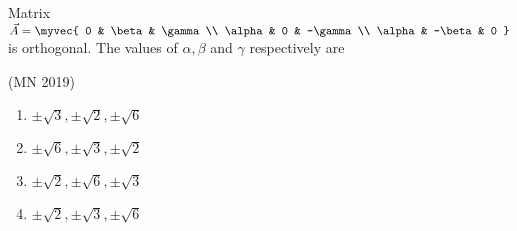 \item Matrix 
$\vec{A}=
\myvec{
0 & \beta & \gamma \\
\alpha & 0 & -\gamma \\
\alpha & -\beta & 0
}
$ is orthogonal. The values of $\alpha, \beta$ and $\gamma$ respectively are

\hfill(MN 2019)
\begin{multicols}{4}
\begin{enumerate}
  \item $\pm \sqrt{3}, \pm \sqrt{2}, \pm \sqrt{6}$
  \item $\pm \sqrt{6}, \pm \sqrt{3}, \pm \sqrt{2}$
  \item $\pm \sqrt{2}, \pm \sqrt{6}, \pm \sqrt{3}$
  \item $\pm \sqrt{2}, \pm \sqrt{3}, \pm \sqrt{6}$
\end{enumerate}
\end{multicols}


